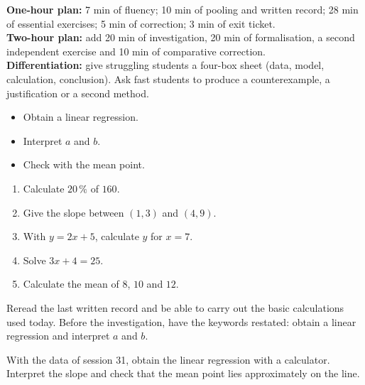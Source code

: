 \ifprof\clearpage
\begin{methode}
\textbf{One-hour plan:} 7 min of fluency; 10 min of pooling and written record; 28 min of essential exercises; 5 min of correction; 3 min of exit ticket.\\
\textbf{Two-hour plan:} add 20 min of investigation, 20 min of formalisation, a second independent exercise and 10 min of comparative correction.\\
\textbf{Differentiation:} give struggling students a four-box sheet (data, model, calculation, conclusion). Ask fast students to produce a counterexample, a justification or a second method.
\end{methode}
\fi
{}
\begin{objectifs}\begin{itemize}\item Obtain a linear regression.\item Interpret $a$ and $b$.\item Check with the mean point.\end{itemize}\end{objectifs}
\begin{automatismes}\begin{enumerate}\item Calculate $20\,\%$ of $160$. \item Give the slope between $(1,3)$ and $(4,9)$. \item With $y=2x+5$, calculate $y$ for $x=7$. \item Solve $3x+4=25$. \item Calculate the mean of $8$, $10$ and $12$. \end{enumerate}\end{automatismes}
\begin{prerequis}Reread the last written record and be able to carry out the basic calculations used today. Before the investigation, have the keywords restated: obtain a linear regression and interpret $a$ and $b$.\end{prerequis}

\begin{activite}
With the data of session 31, obtain the linear regression with a calculator. Interpret the slope and check that the mean point lies approximately on the line.
\begin{center}\end{center}
\end{activite}

